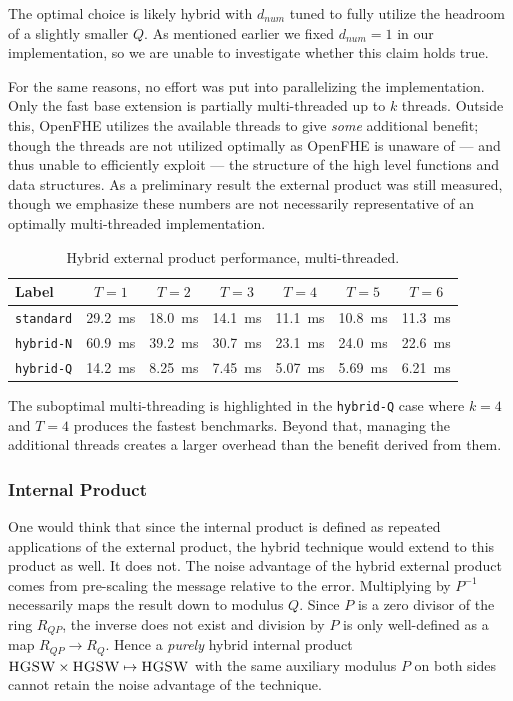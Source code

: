 The optimal choice is likely hybrid with $d_{num}$ tuned to fully utilize the headroom of a slightly smaller $Q$. As mentioned earlier we fixed $d_{num} = 1$ in our implementation, so we are unable to investigate whether this claim holds true. 

For the same reasons, no effort was put into parallelizing the implementation. Only the fast base extension is partially multi-threaded up to $k$ threads. Outside this, OpenFHE utilizes the available threads to give \emph{some} additional benefit; though the threads are not utilized optimally as OpenFHE is unaware of --- and thus unable to efficiently exploit --- the structure of the high level functions and data structures. As a preliminary result the external product was still measured, though we emphasize these numbers are not necessarily representative of an optimally multi-threaded implementation.

\begin{table}[H]
    \caption{Hybrid external product performance, multi-threaded.}
    \label{tab:bench:hybrid-deviation}
    \centering
    \begin{tabular}{lcccccc}
        \toprule
        \textbf{Label} & $T = 1$ & $T = 2$ & $T = 3$ & $T = 4$ & $T = 5$ & $T = 6$ \\
        \midrule
        \texttt{standard} & \num{29.2}~ms & \num{18.0}~ms & \num{14.1}~ms & \num{11.1}~ms & \num{10.8}~ms & \num{11.3}~ms \\
        \texttt{hybrid-N} & \num{60.9}~ms & \num{39.2}~ms & \num{30.7}~ms & \num{23.1}~ms & \num{24.0}~ms & \num{22.6}~ms \\
        \texttt{hybrid-Q} & \num{14.2}~ms & \num{8.25}~ms & \num{7.45}~ms & \num{5.07}~ms & \num{5.69}~ms & \num{6.21}~ms \\
        \bottomrule
    \end{tabular}
\end{table}

The suboptimal multi-threading is highlighted in the \texttt{hybrid-Q} case where $k=4$ and $T=4$ produces the fastest benchmarks. Beyond that, managing the additional threads creates a larger overhead than the benefit derived from them.

\subsubsection{Internal Product}
One would think that since the internal product is defined as repeated applications of the external product, the hybrid technique would extend to this product as well. It does not. The noise advantage of the hybrid external product comes from pre-scaling the message relative to the error. Multiplying by $P^{-1}$ necessarily maps the result down to modulus $Q$. Since $P$ is a zero divisor of the ring $R_{QP}$, the inverse does not exist and division by $P$ is only well-defined as a map $R_{QP}\to R_{Q}$. Hence a \emph{purely} hybrid internal product $\Call{HGSW}{}\times\Call{HGSW}{}\mapsto\Call{HGSW}{}$ with the same auxiliary modulus $P$ on both sides cannot retain the noise advantage of the technique. 

